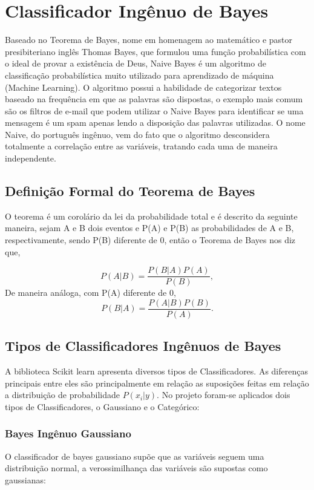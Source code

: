 \documentclass[conference]{IEEEtran}
\begin{document}
\section{Classificador Ingênuo de Bayes}
Baseado no Teorema de Bayes, nome em homenagem ao matemático e pastor presibiteriano inglês Thomas Bayes, que formulou uma função probabilística com o ideal de provar a existência de Deus, Naive Bayes é um algoritmo de classificação probabilística muito utilizado para aprendizado de máquina (Machine Learning). O algoritmo possui a habilidade de categorizar textos baseado na frequência em que as palavras são dispostas, o exemplo mais comum são os filtros de e-mail que podem utilizar o Naive Bayes para identificar se uma mensagem é um spam apenas lendo a disposição das palavras utilizadas. O nome Naive, do português ingênuo, vem do fato que o algoritmo desconsidera totalmente a correlação entre as variáveis, tratando cada uma de maneira independente.

\subsection{Definição Formal do Teorema de Bayes}
O teorema é um corolário da lei da probabilidade total e é descrito da seguinte maneira, sejam A e B dois eventos e P(A) e P(B) as probabilidades de A e B, respectivamente, sendo P(B) diferente de 0, então o Teorema de Bayes nos diz que,

\begin{equation}
    P(A|B) = \frac{P(B|A)P(A)}{P(B)},
\end{equation} 
De maneira análoga, com P(A) diferente de 0,  
\begin{equation}
   P(B|A) = \frac{P(A|B)P(B)}{P(A)}.
\end{equation} 

\subsection{Tipos de Classificadores Ingênuos de Bayes}
A biblioteca Scikit learn apresenta diversos tipos de Classificadores. As diferenças principais entre eles são principalmente em relação as suposições feitas em relação a distribuição de probabilidade $P(x_i|y)$. 
No projeto foram-se aplicados dois tipos de Classificadores, o Gaussiano e o Categórico:

\subsubsection{Bayes Ingênuo Gaussiano}
O classificador de bayes gaussiano supõe que as variáveis seguem uma distribuição normal, a verossimilhança das variáveis são supostas como gaussianas:
\end{document}
